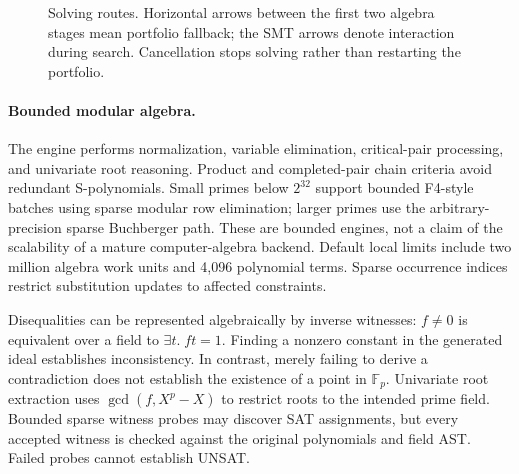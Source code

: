 \documentclass[runningheads]{llncs}
\newcommand{\FF}{\mathbb{F}}
\begin{document}
\begin{figure}[t]
\centering\small
{}
\caption{Solving routes. Horizontal arrows between the first two algebra stages
mean portfolio fallback; the SMT arrows denote interaction during search.
Cancellation stops solving rather than restarting the portfolio.}
\label{fig:architecture}
\end{figure}

\paragraph{Bounded modular algebra.}
The engine performs normalization, variable elimination, critical-pair
processing, and univariate root reasoning. Product and completed-pair chain
criteria avoid redundant S-polynomials. Small primes below $2^{32}$ support
bounded F4-style batches using sparse modular row elimination; larger primes
use the arbitrary-precision sparse Buchberger path. These are bounded engines,
not a claim of the scalability of a mature computer-algebra backend. Default
local limits include two million algebra work units and 4,096 polynomial terms.
Sparse occurrence indices restrict substitution updates to affected constraints.

Disequalities can be represented algebraically by inverse witnesses:
$f\ne 0$ is equivalent over a field to $\exists t.\;ft=1$. Finding a nonzero
constant in the generated ideal establishes inconsistency. In contrast, merely
failing to derive a contradiction does not establish the existence of a point
in $\FF_p$. Univariate root extraction uses $\gcd(f,X^p-X)$ to restrict roots
to the intended prime field. Bounded sparse witness probes may discover SAT
assignments, but every accepted witness is checked against the original
polynomials and field AST. Failed probes cannot establish UNSAT.
\end{document}
